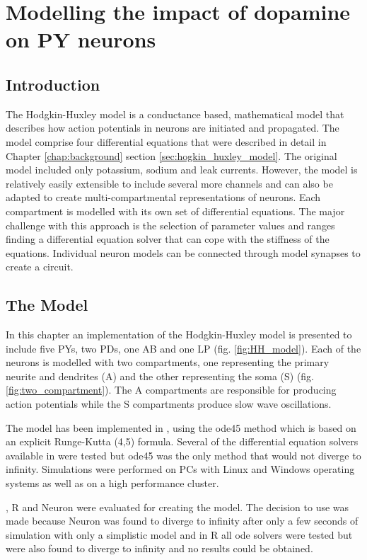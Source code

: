 \chapter{Modelling the impact of dopamine on PY neurons}
\label{chap:modelling}
\section{Introduction}
\label{sec:model}

The Hodgkin-Huxley model is a conductance based, mathematical model that describes how action potentials in neurons are initiated and propagated. The model comprise four differential equations that were described in detail in Chapter \ref{chap:background} section \ref{sec:hogkin_huxley_model}. The original model included only potassium, sodium and leak currents. However, the model is relatively easily extensible to include several more channels and can also be adapted to create multi-compartmental representations of neurons. Each compartment is modelled with its own set of differential equations. The major challenge with this approach is the selection of parameter values and ranges finding a differential equation solver that can cope with the stiffness of the equations. Individual neuron models can be connected through model synapses to create a circuit.

\section{The Model}

In this chapter an implementation of the Hodgkin-Huxley model is presented to include five \acp{PY}, two \acp{PD}, one \ac{AB} and one \ac{LP} (fig. \ref{fig:HH_model}). Each of the neurons is modelled with two compartments, one representing the primary neurite and dendrites (A) and the other representing the soma (S) (fig. \ref{fig:two_compartment}). The A compartments are responsible for producing action potentials while the S compartments produce slow wave oscillations. 

The model has been implemented in \matlab, using the ode45 method which is based on an explicit Runge-Kutta (4,5) formula. Several of the differential equation solvers available in \matlab were tested but ode45 was the only method that would not diverge to infinity. Simulations were performed on PCs with Linux and Windows operating systems as well as on a high performance cluster.

\matlab, R and Neuron were evaluated for creating the model. The decision to use \matlab was made because Neuron was found to diverge to infinity after only a few seconds of simulation with only a simplistic model and in R all ode solvers were tested but were also found to diverge to infinity and no results could be obtained. 

